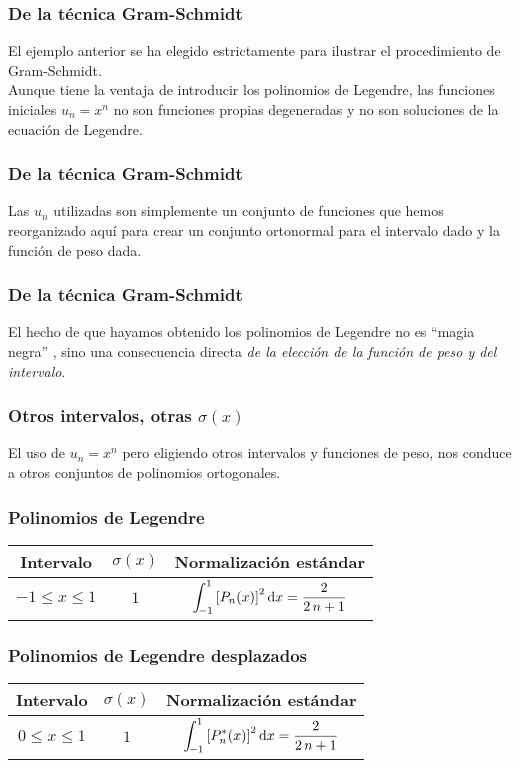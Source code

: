 \documentclass[12pt]{beamer}
\begin{document}
\begin{frame}
\frametitle{De la técnica Gram-Schmidt}
El ejemplo anterior se ha elegido estrictamente para ilustrar el procedimiento de Gram-Schmidt.
\\
\bigskip
\pause
Aunque tiene la ventaja de introducir los polinomios de Legendre, las funciones iniciales $u_{n} = x^{n}$ no son funciones propias degeneradas y no son soluciones de la ecuación de Legendre.
\end{frame}
\begin{frame}
\frametitle{De la técnica Gram-Schmidt}  
Las $u_{n}$ utilizadas son simplemente un conjunto de funciones que hemos reorganizado aquí para crear un conjunto ortonormal para el intervalo dado y la función de peso dada.
\end{frame}
\begin{frame}
\frametitle{De la técnica Gram-Schmidt}  
El hecho de que hayamos obtenido los polinomios de Legendre no es \enquote{magia negra} , sino una consecuencia directa \emph{de la elección de la función de peso y del intervalo}.
\end{frame}
\begin{frame}
\frametitle{Otros intervalos, otras $\sigma (x)$}  
El uso de $u_{n} = x^{n}$ pero eligiendo otros intervalos y funciones de peso, nos conduce a otros conjuntos de polinomios ortogonales. 
\end{frame}
\begin{frame}
\frametitle{Polinomios de Legendre}
\begin{table}
  \begin{tabular}{c c c}
  Intervalo & $\sigma (x)$ & Normalización estándar \\ \hline
  $-1 \leq x \leq 1$ & $1$ & $\displaystyle \scaleint{5ex}_{\bs -1}^{1} \left[ P_{n} (x) \right]^{2} \dd{x} = \dfrac{2}{2 \, n + 1} $
  \end{tabular}
\end{table}
\end{frame}
\begin{frame}
\frametitle{Polinomios de Legendre desplazados}
\begin{table}
  \begin{tabular}{c c c}
  Intervalo & $\sigma (x)$ & Normalización estándar \\ \hline
  $0 \leq x \leq 1$ & $1$ & $\displaystyle \scaleint{5ex}_{\bs -1}^{1} \left[ P_{n}^{*}(x) \right]^{2} \dd{x} = \dfrac{2}{2 \, n + 1}$  
\end{tabular}
\end{table}
\end{frame}
\end{document}
